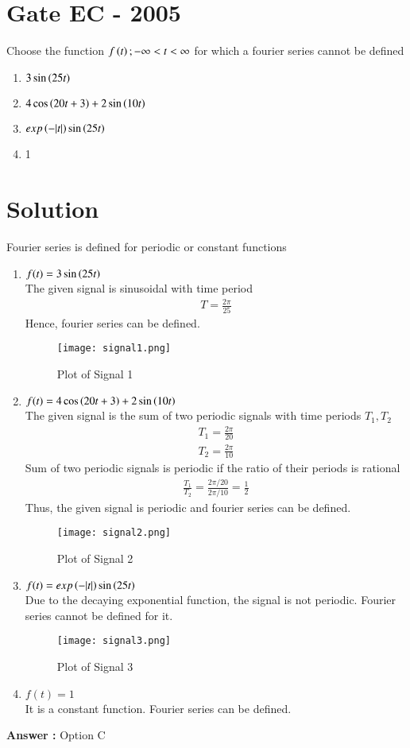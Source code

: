 \documentclass[journal,12pt,twocolumn]{IEEEtran}
\begin{document}
\section{Gate EC - 2005}
Choose the function $f\left(t\right) ; -\infty < t < \infty$ for which a fourier series cannot be defined
\begin{enumerate}[label=\Alph*)]
    \item $3\sin\left(25t\right)$
    \item $4\cos{\ensuremath{\left(20t+3\right)}} + 2\sin{\ensuremath{\left(10t\right)}}$
    \item $exp\left(-|t|\right)\sin{\ensuremath{\left(25t\right)}}$
    \item 1
\end{enumerate}
\section{Solution}
Fourier series is defined for periodic or constant functions
\begin{enumerate}
    \item $f(t) = 3\sin\left(25t\right)$\\
    The given signal is sinusoidal with time period 
    \begin{align}
        T = \frac{2\pi}{25}
    \end{align}
    Hence, fourier series can be defined.
    \begin{figure}[H]
    \centering
    \texttt{[image: signal1.png]}
    \caption{Plot of Signal 1}
    \label{fig:signal_1}
    \end{figure}
    \item $f(t) = 4\cos{\ensuremath{\left(20t+3\right)}} + 2\sin{\ensuremath{\left(10t\right)}}$\\
    The given signal is the sum of two periodic signals with time periods $T_1, T_2$
    \begin{align}
        T_1 = \frac{2\pi}{20}\\
        T_2 = \frac{2\pi}{10}
    \end{align}
    Sum of two periodic signals is periodic if the ratio of their periods is rational
    \begin{align}
        \frac{T_1}{T_2} = \frac{2\pi/20}{2\pi/10} = \frac{1}{2}
    \end{align}
    Thus, the given signal is periodic and fourier series can be defined.
    \begin{figure}[H]
    \centering
    \texttt{[image: signal2.png]}
    \caption{Plot of Signal 2}
    \label{fig:signal_2}
    \end{figure}
    \item $f(t) = exp\left(-|t|\right)\sin{\ensuremath{\left(25t\right)}}$\\
    Due to the decaying exponential function, the signal is not periodic. Fourier series cannot be defined for it.
    \begin{figure}[H]
    \centering
    \texttt{[image: signal3.png]}
    \caption{Plot of Signal 3}
    \label{fig:signal_3}
    \end{figure}
    \item $f(t) = 1$\\
    It is a constant function. Fourier series can be defined.
\end{enumerate}
\textbf{Answer :} Option C
\end{document}
